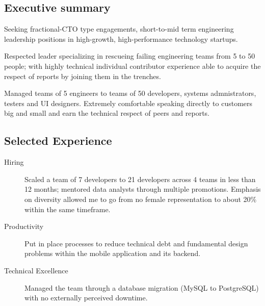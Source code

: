 \begin{langen}
\section{Executive summary}

Seeking fractional-CTO type engagements, short-to-mid term engineering leadership positions in high-growth, high-performance technology startups.

\vspace{2 mm}

Respected leader specializing in rescueing failing engineering teams from 5 to 50 people; with highly technical individual contributor experience able to acquire the respect of reports by joining them in the trenches.

\vspace{2 mm}

Managed teams of 5 engineers to teams of 50 developers, systems admnistrators, testers and UI designers. Extremely comfortable speaking directly to customers big and small and earn the technical respect of peers and reports.

\end{langen}

\begin{langen}
\section{Selected Experience}
\end{langen}

\vspace{2 mm}


\begin{langen}
\begin{description}%
\item[Hiring] Scaled a team of 7 developers to 21 developers across 4 teams in less than 12 months; mentored data analysts through multiple promotions. Emphasis on diversity allowed me to go from no female representation to about 20\% within the same timeframe.
\item[Productivity] Put in place processes to reduce technical debt and fundamental design problems within the mobile application and its backend.
\item[Technical Excellence] Managed the team through a database migration (MySQL to PostgreSQL) with no externally perceived downtime.
\end{description}
\end{langen}

